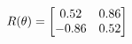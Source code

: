 \documentclass[preview]{standalone}
\begin{document}
\begin{align*}
\special{dvisvgm:raw <g id='unique000'>}R(\theta) = \begin{bmatrix}0.52 & 0.86\\-0.86 & 0.52\end{bmatrix}\special{dvisvgm:raw </g>}
\end{align*}
\end{document}
